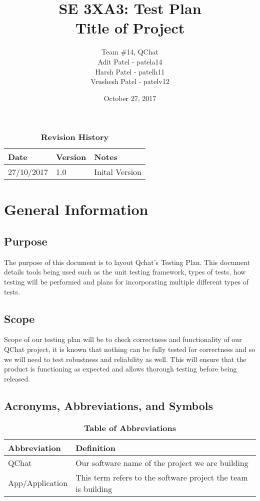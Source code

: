 \documentclass[12pt, titlepage]{article}
\title{SE 3XA3: Test Plan\\Title of Project}
\author{Team \#14, QChat
		\\ Adit Patel - patela14
		\\ Harsh Patel - patelh11
		\\ Vrushesh Patel - patelv12
}
\date{October 27, 2017}
\begin{document}
\maketitle

\tableofcontents
\listoftables
\listoffigures


\begin{table}[bp]
\caption{\bf Revision History}
\begin{tabularx}{\textwidth}{p{3cm}p{2cm}X}
\toprule {\bf Date} & {\bf Version} & {\bf Notes}\\
\midrule
27/10/2017 & 1.0 & Inital Version\\
\bottomrule
\end{tabularx}
\end{table}


\newpage


\section{General Information}

\subsection{Purpose}
The purpose of this document is to layout Qchat’s Testing Plan. This document details tools being used such as the unit testing framework, types of tests, how testing will be performed and plans for incorporating multiple different types of tests. 

\subsection{Scope}
Scope of our testing plan will be to check correctness and functionality of our QChat project, it is known that nothing can be fully tested for correctness and so we will need to test robustness and reliability as well. This will ensure that the product is functioning as expected and allows thorough testing before being released. 

\subsection{Acronyms, Abbreviations, and Symbols}
	
\begin{table}[hbp]
\caption{\textbf{Table of Abbreviations}} \label{Table}

\begin{tabularx}{\textwidth}{p{3cm}X}
\toprule
\textbf{Abbreviation} & \textbf{Definition} \\
\midrule
QChat & Our software name of the project we are building\\
App/Application & This term refers to the software project the team is building\\
\bottomrule
\end{tabularx}

\end{table}
\end{document}
